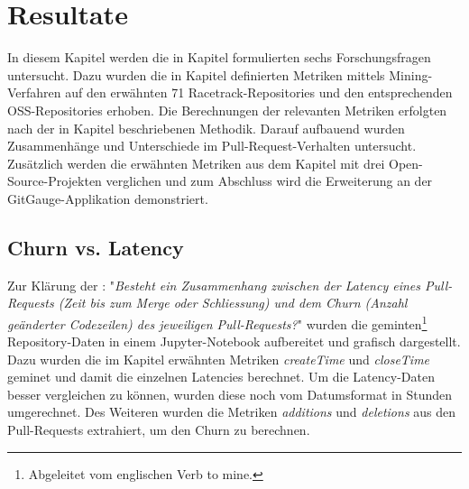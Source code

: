 


\chapter{Resultate} %

\label{Chapter4} %

In diesem Kapitel werden die in Kapitel  formulierten sechs Forschungsfragen untersucht. Dazu wurden die in Kapitel  definierten Metriken mittels Mining-Verfahr\-en auf den erwähnten 71 Racetrack-Repositories und den entsprechenden OSS-Repositories erhoben. Die Berechnungen der relevanten Metriken erfolgten nach der in Kapitel  beschriebenen Methodik. Darauf aufbauend wurden Zusammenhänge und Unterschiede im Pull-Request-Verhalten untersucht. Zusätzlich werden die erwähnten Metriken aus dem Kapitel  mit drei Open-Source-Projekten verglichen und zum Abschluss wird die Erweiterung an der GitGauge-Applikation demonstriert. 


\section{Churn vs. Latency}
\label{sec:ResultatChurnLatency}
Zur Klärung der : "\textit{Besteht ein Zusammenhang zwischen der Latency eines Pull-Requests (Zeit bis zum Merge oder Schliessung) und dem Churn (Anzahl geänderter Codezeilen) des jeweiligen Pull-Requests?}" wurden die geminten\footnote{Abgeleitet vom englischen Verb to mine.} Repository-Daten in einem Jupyter-Notebook aufbereitet und grafisch dargestellt. Dazu wurden die im Kapitel  erwähnten Metriken \textit{createTime} und \textit{closeTime} geminet und damit die einzelnen Latencies berechnet. Um die Latency-Daten besser vergleichen zu können, wurden diese noch vom Datumsformat in Stunden umgerechnet. Des Weiteren wurden die Metriken  \textit{additions} und  \textit{deletions} aus den Pull-Requests extrahiert, um den Churn zu berechnen.

